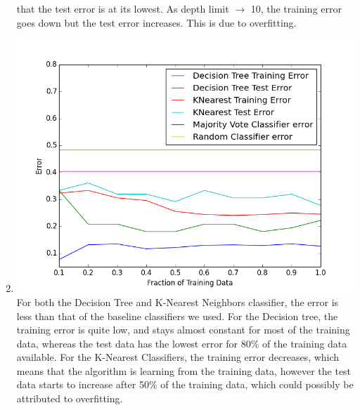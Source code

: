 \documentclass[11pt]{article}
\newcommand{\solution}[1]{{{\color{blue}{\bf Solution:} {#1}}}}
\begin{document}
\begin{enumerate}
that the test error is at its lowest. As depth limit $\rightarrow$ 10, the training error goes down but
the test error increases. This is due to overfitting. 
\newpage
\item
\solution{} \newline
\includegraphics[scale=0.6]{4h.png}
For both the Decision Tree and K-Nearest Neighbors classifier, the error is less than that of the
baseline classifiers we used. For the Decision tree, the training error is quite low, and stays
almost constant for most of the training data, whereas the test data has the lowest error for 
80\% of the training data available. For the K-Nearest Classifiers, the training error decreases,
which means that the algorithm is learning from the training data, however the test data starts
to increase after 50\% of the training data, which could possibly be attributed to overfitting.

\end{enumerate}
\end{document}
